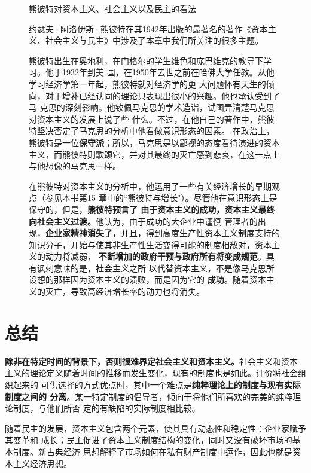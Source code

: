 \begin{figure}[ht]
\begin{mybox}{熊彼特对资本主义、社会主义以及民主的看法}
  \begin{multicols}{2}约瑟夫·阿洛伊斯·熊彼特在其1942年出版的最著名的著作《资本主
义、社会主义与民主》中涉及了本章中我们所关注的很多主题。

    熊彼特出生在奥地利，在门格尔的学生维色和庞巴维克的教导下学习。他于1932年到美
国，在1950年去世之前在哈佛大学任教。从他学习经济学第一年起，熊彼特就对经济学的更
大问题怀有天生的倾向，对于增补已经认同的理论只表现出很小的兴趣。他也承认受到了马
克思的深刻影响。他钦佩马克思的学术造诣，试图弄清楚马克思对资本主义的发展上说了些
什么。不过，在他自己的著作中，熊彼特坚决否定了马克思的分析中他看做意识形态的因素。
在政治上，熊彼特是一位\textbf{保守派}；所以，马克思是以鄙视的态度看待演进的资本
主义，而熊彼特则歌颂它，并对其最终的灭亡感到悲哀，在这一点上与他想像的马克思一样。

    在熊彼特对资本主义的分析中，他运用了一些有关经济增长的早期观点（参见本书第15
章中的“熊彼特与增长"）。尽管他在意识形态上是保守的，但是，\textbf{熊彼特预言了
由于资本主义的成功，资本主义最终向社会主义过渡。}他认为，由于成功的大企业中谨慎
管理者的出现，\textbf{企业家精神消失了}，并且，得到高度生产性资本主义制度支持的
知识分子，开始与使其非生产性生活变得可能的制度相敌对，资本主义的动力将减弱，
\textbf{不断增加的政府干预与政府所有将变成规范}。具有讽刺意味的是，社会主义之所
以代替资本主义，不是像马克思所设想的那样因为资本主义的溃败，而是因为它的
\textbf{成功}。随着资本主义的灭亡，导致高经济增长率的动力也将消失。
  \end{multicols}
\end{mybox}
\end{figure}

\section{总结}

\textbf{除非在特定时间的背景下，否则很难界定社会主义和资本主义。}社会主义和资本
主义的理论定义随着时间的推移而发生变化，现有的制度也是如此。评价将社会组织起来的
可供选择的方式优点时，其中一个难点是\textbf{纯粹理论上的制度与现有实际制度之间的
分离}。某一特定制度的倡导者，倾向于将他们所喜欢的完美的纯粹理论制度，与他们所否
定的有缺陷的实际制度相比较。

随着民主的发展，资本主义包含两个元素，使其具有动态性和稳定性：企业家赋予其变革和
成长；民主促进了资本主义制度结构的变化，同时又没有破坏市场的基本制度。新古典经济
思想解释了市场如何在私有财产制度中运作，因此也就是资本主义经济思想。

